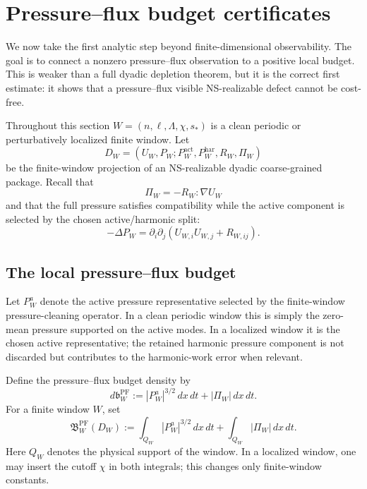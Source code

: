 \documentclass[11pt]{article}
\numberwithin{equation}{section}
\theoremstyle{plain}
\theoremstyle{definition}
\theoremstyle{remark}
\newcommand{\PF}{\mathrm{PF}}
\newcommand{\har}{\mathrm{har}}
\newcommand{\bfB}{\mathfrak B}
\newcommand{\act}{\mathrm{act}}
\begin{document}
\section{Pressure--flux budget certificates}
\label{sec:pressure-flux-budget-certificates}

We now take the first analytic step beyond finite-dimensional observability.  The goal is to connect a nonzero pressure--flux observation to a positive local budget.  This is weaker than a full dyadic depletion theorem, but it is the correct first estimate: it shows that a pressure--flux visible NS-realizable defect cannot be cost-free.

Throughout this section \(W=(n,\ell,\Lambda,\chi,s_*)\) is a clean periodic or perturbatively localized finite window.  Let
\[
        D_W=(U_W,P_W;P_W^{\act},P_W^{\har},R_W,\Pi_W)
\]
be the finite-window projection of an NS-realizable dyadic coarse-grained package.  Recall that
\[
        \Pi_W=-R_W:\nabla U_W
\]
and that the full pressure satisfies compatibility while the active component is selected by the chosen active/harmonic split:
\[
        -\Delta P_W
        =
        \partial_i\partial_j(U_{W,i}U_{W,j}+R_{W,ij}).
\]

\subsection{The local pressure--flux budget}

Let \(P^a_W\) denote the active pressure representative selected by the finite-window pressure-cleaning operator.  In a clean periodic window this is simply the zero-mean pressure supported on the active modes.  In a localized window it is the chosen active representative; the retained harmonic pressure component is not discarded but contributes to the harmonic-work error when relevant.

Define the pressure--flux budget density by
\[
        d\mathfrak b^{\PF}_W
        :=
        |P^a_W|^{3/2}\,dx\,dt
        +
        |\Pi_W|\,dx\,dt.
\]
For a finite window \(W\), set
\begin{equation}
        \bfB^{\PF}_W(D_W)
        :=
        \int_{Q_W}|P^a_W|^{3/2}\,dx\,dt
        +
        \int_{Q_W}|\Pi_W|\,dx\,dt.
        \label{eq:local-pf-budget}
\end{equation}
Here \(Q_W\) denotes the physical support of the window.  In a localized window, one may insert the cutoff \(\chi\) in both integrals; this changes only finite-window constants.
\end{document}
